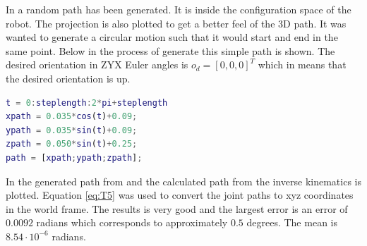 In  a random path has been generated. It is inside the configuration space of the robot. The projection is also plotted to get a better feel of the 3D path. It was wanted to generate a circular motion such that it would start and end in the same point. Below in  the process of generate this simple path is shown. The desired orientation in ZYX Euler angles is $o_d = [0,0,0]^T$ which in means that the desired orientation is up.
\begin{lstlisting}[caption={MATLAB code for creating path},label={lst:path},language=Matlab]
t = 0:steplength:2*pi+steplength
xpath = 0.035*cos(t)+0.09;
ypath = 0.035*sin(t)+0.09;
zpath = 0.050*sin(t)+0.25;
path = [xpath;ypath;zpath];
\end{lstlisting}
In  the generated path from  and the calculated path from the inverse kinematics is plotted. Equation \eqref{eq:T5} was used to convert the joint paths to xyz coordinates in the world frame. The results is very good and the largest error is an error of $0.0092$ radians which corresponds to approximately $0.5$ degrees. The mean is $8.54\cdot10^{-6}$ radians. 


